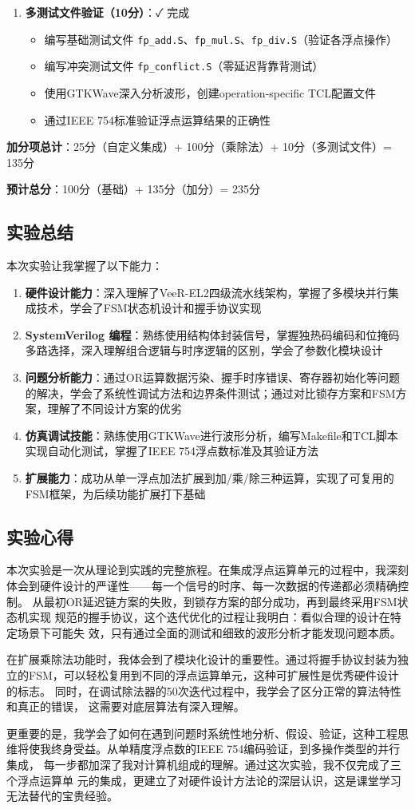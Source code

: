 \documentclass[12pt,a4paper]{article}
\begin{document}
\begin{enumerate}[itemsep=5pt, parsep=3pt]
    \item \textbf{多测试文件验证（10分）}：✓ 完成
    \begin{itemize}[itemsep=0pt, parsep=3pt]
        \item 编写基础测试文件 \texttt{fp\_add.S}、\texttt{fp\_mul.S}、\texttt{fp\_div.S}（验证各浮点操作）
        \item 编写冲突测试文件 \texttt{fp\_conflict.S}（零延迟背靠背测试）
        \item 使用GTKWave深入分析波形，创建operation-specific TCL配置文件
        \item 通过IEEE 754标准验证浮点运算结果的正确性
    \end{itemize}
\end{enumerate}

\textbf{加分项总计}：25分（自定义集成）+ 100分（乘除法）+ 10分（多测试文件）= 135分

\textbf{预计总分}：100分（基础）+ 135分（加分）= 235分

\subsection{实验总结}

本次实验让我掌握了以下能力：
\begin{enumerate}[itemsep=3pt, parsep=3pt]
    \item \textbf{硬件设计能力}：深入理解了VeeR-EL2四级流水线架构，掌握了多模块并行集成技术，学会了FSM状态机设计和握手协议实现
    \item \textbf{SystemVerilog 编程}：熟练使用结构体封装信号，掌握独热码编码和位掩码多路选择，深入理解组合逻辑与时序逻辑的区别，学会了参数化模块设计
    \item \textbf{问题分析能力}：通过OR运算数据污染、握手时序错误、寄存器初始化等问题的解决，学会了系统性调试方法和边界条件测试；通过对比锁存方案和FSM方案，理解了不同设计方案的优劣
    \item \textbf{仿真调试技能}：熟练使用GTKWave进行波形分析，编写Makefile和TCL脚本实现自动化测试，掌握了IEEE 754浮点数标准及其验证方法
    \item \textbf{扩展能力}：成功从单一浮点加法扩展到加/乘/除三种运算，实现了可复用的FSM框架，为后续功能扩展打下基础
\end{enumerate}

\subsection{实验心得}

本次实验是一次从理论到实践的完整旅程。在集成浮点运算单元的过程中，我深刻
体会到硬件设计的严谨性——每一个信号的时序、每一次数据的传递都必须精确控制。
从最初OR延迟链方案的失败，到锁存方案的部分成功，再到最终采用FSM状态机实现
规范的握手协议，这个迭代优化的过程让我明白：看似合理的设计在特定场景下可能失
效，只有通过全面的测试和细致的波形分析才能发现问题本质。

在扩展乘除法功能时，我体会到了模块化设计的重要性。通过将握手协议封装为独
立的FSM，可以轻松复用到不同的浮点运算单元，这种可扩展性是优秀硬件设计的标志。
同时，在调试除法器的50次迭代过程中，我学会了区分正常的算法特性和真正的错误，
这需要对底层算法有深入理解。

更重要的是，我学会了如何在遇到问题时系统性地分析、假设、验证，这种工程思
维将使我终身受益。从单精度浮点数的IEEE 754编码验证，到多操作类型的并行集成，
每一步都加深了我对计算机组成的理解。通过这次实验，我不仅完成了三个浮点运算单
元的集成，更建立了对硬件设计方法论的深层认识，这是课堂学习无法替代的宝贵经验。
\end{document}
